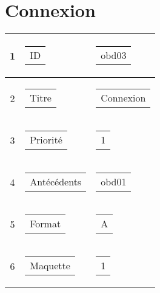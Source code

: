 \documentclass[a4paper, 12pt, french]{article}
\makeatletter
\newcommand{\retourLigne}[2][c]{\begin{tabular}[#1]{@{}l@{}}#2\end{tabular}}
\makeatother
\begin{document}
	\section{Connexion}
	\begin{longtable}{|c|l|l|}
 	\hline
    1 & \retourLigne{ID}  & \retourLigne{obd03} \\ \hline
  	\hline
    2 & \retourLigne{Titre}  & \retourLigne{Connexion} \\ \hline
    3 & \retourLigne{Priorité}  & \retourLigne{1} \\ \hline
    4 & \retourLigne{Antécédents}  & \retourLigne{obd01} \\ \hline
    5 & \retourLigne{Format}  & \retourLigne{A} \\ \hline
    6 & \retourLigne{Maquette}  & \retourLigne{1} \\ \hline
	\end{longtable}
\end{document}
